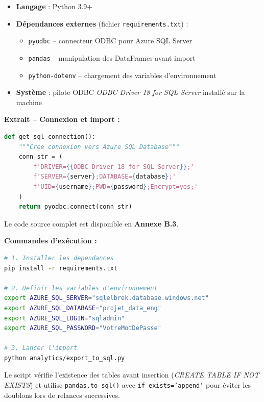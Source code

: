 \documentclass[12pt,a4paper]{article}
\begin{document}
\begin{itemize}
  \item \textbf{Langage} : Python 3.9+
  \item \textbf{Dépendances externes} (fichier \texttt{requirements.txt}) :
    \begin{itemize}
      \item \texttt{pyodbc} -- connecteur ODBC pour Azure SQL Server
      \item \texttt{pandas} -- manipulation des DataFrames avant import
      \item \texttt{python-dotenv} -- chargement des variables d'environnement
    \end{itemize}
  \item \textbf{Système} : pilote ODBC \textit{ODBC Driver 18 for SQL Server} installé sur la machine
\end{itemize}

\textbf{Extrait -- Connexion et import :}

\begin{lstlisting}[language=Python]
def get_sql_connection():
    """Cree connexion vers Azure SQL Database"""
    conn_str = (
        f'DRIVER={{ODBC Driver 18 for SQL Server}};'
        f'SERVER={server};DATABASE={database};'
        f'UID={username};PWD={password};Encrypt=yes;'
    )
    return pyodbc.connect(conn_str)
\end{lstlisting}

Le code source complet est disponible en \textbf{Annexe B.3}.

\textbf{Commandes d'exécution :}

\begin{lstlisting}[language=bash]
# 1. Installer les dependances
pip install -r requirements.txt

# 2. Definir les variables d'environnement
export AZURE_SQL_SERVER="sqlelbrek.database.windows.net"
export AZURE_SQL_DATABASE="projet_data_eng"
export AZURE_SQL_LOGIN="sqladmin"
export AZURE_SQL_PASSWORD="VotreMotDePasse"

# 3. Lancer l'import
python analytics/export_to_sql.py
\end{lstlisting}

Le script vérifie l'existence des tables avant insertion (\textit{CREATE TABLE IF NOT EXISTS}) et utilise \texttt{pandas.to\_sql()} avec \texttt{if\_exists='append'} pour éviter les doublons lors de relances successives.


\end{document}

